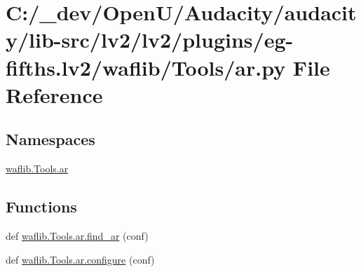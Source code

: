 \hypertarget{lv2_2plugins_2eg-fifths_8lv2_2waflib_2_tools_2ar_8py}{}\section{C\+:/\+\_\+dev/\+Open\+U/\+Audacity/audacity/lib-\/src/lv2/lv2/plugins/eg-\/fifths.lv2/waflib/\+Tools/ar.py File Reference}
\label{lv2_2plugins_2eg-fifths_8lv2_2waflib_2_tools_2ar_8py}
\subsection*{Namespaces}
\begin{DoxyCompactItemize}
\item 
 \hyperlink{namespacewaflib_1_1_tools_1_1ar}{waflib.\+Tools.\+ar}
\end{DoxyCompactItemize}
\subsection*{Functions}
\begin{DoxyCompactItemize}
\item 
def \hyperlink{namespacewaflib_1_1_tools_1_1ar_ade578f6e88784a6a5524a2ff2333096b}{waflib.\+Tools.\+ar.\+find\+\_\+ar} (conf)
\item 
def \hyperlink{namespacewaflib_1_1_tools_1_1ar_adac714580d14727514e133de54b6c0b3}{waflib.\+Tools.\+ar.\+configure} (conf)
\end{DoxyCompactItemize}
